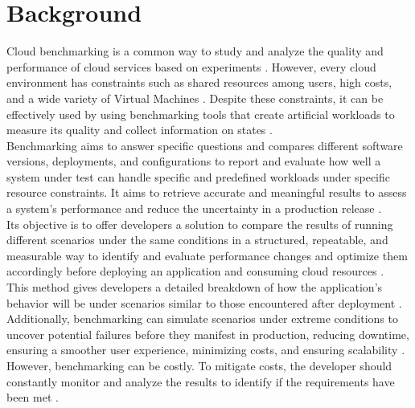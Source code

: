 \section{Background}
\label{cha:background}
Cloud benchmarking is a common way to study and analyze the quality and performance of cloud services based on experiments  \cite{bermbach2017quality, vazquez2014cloudBenchmarkSurvey}. However, every cloud environment has constraints such as shared resources among users, high costs, and a wide variety of Virtual Machines \cite{snellman2011towardsAutomatic, scheuner2018estimatingCloudApplication}. Despite these constraints, it can be effectively used by using benchmarking tools that create artificial workloads to measure its quality and collect information on states \cite{grambow2020benchmarkingMicroservicesApplication, grambow2019continuousBenchmarking, bermbach2017quality}. \\
Benchmarking aims to answer specific questions and compares different software versions, deployments, and configurations to report and evaluate how well a system under test can handle specific and predefined workloads under specific resource constraints. It aims to retrieve accurate and meaningful results to assess a system’s performance and reduce the uncertainty in a production release \cite{folkerts2012benchmarking, grambow2020benchmarkingMicroservicesApplication, grambow2019continuousBenchmarking, grambow2020benchmarkingMicroservicesperformance}. \\
Its objective is to offer developers a solution to compare the results of running different scenarios under the same conditions in a structured, repeatable, and measurable way to identify and evaluate performance changes and optimize them accordingly before deploying an application and consuming cloud resources \cite{shang2015automatedDetection}. \\
This method gives developers a detailed breakdown of how the application’s behavior will be under scenarios similar to those encountered after deployment \cite{palit2016demystifying, palit2016demystifying}. Additionally, benchmarking can simulate scenarios under extreme conditions to uncover potential failures before they manifest in production, reducing downtime, ensuring a smoother user experience, minimizing costs, and ensuring scalability \cite{japke2023earlymicrobenchmarkcatches, grambow2020benchmarkingMicroservicesperformance, grambow2020benchmarkingMicroservicesApplication}. However, benchmarking can be costly. To mitigate costs, the developer should constantly monitor and analyze the results to identify if the requirements have been met \cite{grambow2020benchmarkingMicroservicesperformance}. \\
